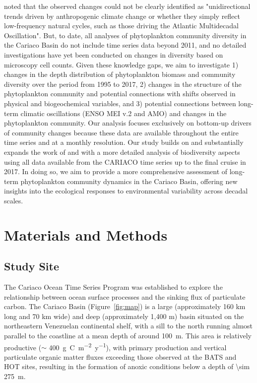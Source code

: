 \documentclass[draft]{agujournal2019}
\begin{document}
 noted that the observed changes could not be clearly identified as "unidirectional trends driven by anthropogenic climate change or whether they simply reflect low-frequency natural cycles, such as those driving the Atlantic Multidecadal Oscillation". But, to date, all analyses of phytoplankton community diversity in the Cariaco Basin do not include time series data beyond 2011, and no detailed investigations have yet been conducted on changes in diversity based on microscopy cell counts. Given these knowledge gaps, we aim to investigate 1) changes in the depth distribution of phytoplankton biomass and community diversity over the period from 1995 to 2017, 2) changes in the structure of the phytoplankton community and potential connections with shifts observed in physical and biogeochemical variables, and 3) potential connections between long-term climatic oscillations (ENSO MEI v.2 and AMO) and changes in the phytoplankton community. Our analysis focuses exclusively on bottom-up drivers of community changes because these data are available throughout the entire time series and at a monthly resolution. Our study builds on and substantially expands the work of  and  with a more detailed analysis of biodiversity aspects using all data available from the CARIACO time series up to the final cruise in 2017. In doing so, we aim to provide a more comprehensive assessment of long-term phytoplankton community dynamics in the Cariaco Basin, offering new insights into the ecological responses to environmental variability across decadal scales.
   


\section{Materials and Methods}
%
\subsection{Study Site}
    The Cariaco Ocean Time Series Program was established to explore the relationship between ocean surface processes and the sinking flux of particulate carbon. The Cariaco Basin (Figure~\ref{fig:map}) is a large (approximately 160 km long and 70 km wide) and deep (approximately 1,400 m) basin situated on the northeastern Venezuelan continental shelf, with a sill to the north running almost parallel to the coastline at a mean depth of around \qty{100}{m}. This area is relatively productive ($\sim$ \qty{400}{g.C.m^{-2}.y^{-1}}), with primary production and vertical particulate organic matter fluxes exceeding those observed at the BATS and HOT sites, resulting in the formation of anoxic conditions below a depth of  \qty{\sim 275}{m}.
\end{document}
